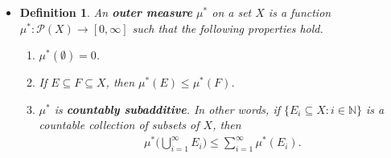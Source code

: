 \documentclass[10pt]{article}
\newtheorem{definition}[lemma]{Definition}
\newcommand{\mcal}[1]{\mathcal{#1}}
\begin{document}
\begin{itemize}
\begin{proof}
    For (d), let $A \in \mcal{A}$. We have that $\{A, \emptyset, \emptyset, \dotsc)$ is a cover of $A$. As a result,
    \begin{align*}
      \mu^*(A) \leq \mu(A) + \mu(\emptyset) + \mu(\emptyset) + \dotsb = \mu(A).
    \end{align*}
    Let $(E_j)$ be a cover of $A$. We have that $A = \bigcup (A \cap E_j)$. Because $\mu$ is a measure,
    \begin{align*}
      \mu(A) \leq \sum_{j=1}^\infty \mu(A \cap E_j) \leq \sum_{j=1}^\infty \mu(E_j).
    \end{align*}
    It follows that $\mu(A) \leq \inf\{ \sum \mu(E_j) : (E_j) \in \mathfrak{C}(A) \} = \mu^*(A)$. Hence, $\mu(A) = \mu^*(A)$.

    For (e), let $\varepsilon > 0$ be arbitrary. For each $n$, choose a sequence $(E_{nk})$ of sets in $\mcal{A}$ such that $(E_{nk})$ covers $B_n$ and
    \begin{align*}
      \sum_{k=1}^\infty \mu(E_{nk}) \leq \mu^*(B_n) + \frac{\varepsilon}{2^n}.
    \end{align*}
    Since $\{ E_{nk}: n, k \in \mathbb{N} \}$ is a countable collection from $\mcal{A}$ whose union contains $\bigcup B_n$, it follows that
    \begin{align*}
      \mu^*\bigg( \bigcup_{n=1}^\infty B_n \bigg)
      \leq \sum_{n=1}^\infty \sum_{k=1}^\infty \mu(E_{nk}) \leq \varepsilon + \sum_{k=1}^\infty \mu^*(B_n).
    \end{align*}
    Since $\varepsilon$ can be arbitrarily small, we have that Property (e) holds.
  \end{proof}

  \item \begin{definition}
    An {\bf outer measure} $\mu^*$ on a set $X$ is a function $\mu^*: \mcal{P}(X) \rightarrow [0,\infty]$ such that the following properties hold.
    \begin{enumerate}
      \item $\mu^*(\emptyset) = 0$.
      \item If $E \subseteq F \subseteq X$, then $\mu^*(E) \leq \mu^*(F)$.
      \item $\mu^*$ is {\bf countably subadditive}. In other words, if $\{ E_i \subseteq X : i \in \mathbb{N} \}$ is a countable collection of subsets of $X$, then
      \begin{align*}
          \mu^*\bigg( \bigcup_{i=1}^\infty E_i \bigg) \leq \sum_{i=1}^\infty \mu^*(E_i).
      \end{align*}
    \end{enumerate}
  \end{definition}


\end{itemize}
\end{document}
